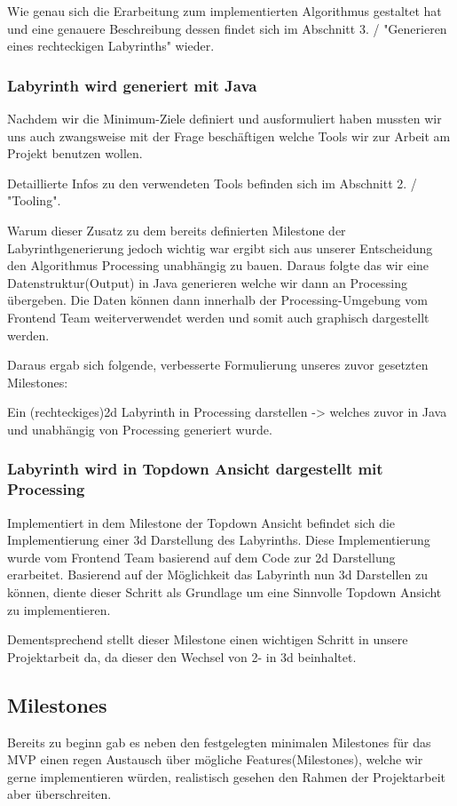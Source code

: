	Wie genau sich die Erarbeitung zum implementierten Algorithmus gestaltet hat und eine genauere Beschreibung dessen findet sich im Abschnitt 3. / "Generieren eines rechteckigen Labyrinths" wieder.

    \subsubsection*{Labyrinth wird generiert mit Java}
		Nachdem wir die Minimum-Ziele definiert und ausformuliert haben mussten wir uns auch zwangsweise mit der Frage beschäftigen welche Tools wir zur Arbeit am Projekt benutzen wollen.
		
		Detaillierte Infos zu den verwendeten Tools befinden sich im Abschnitt 2. / "Tooling".
		
		Warum dieser Zusatz zu dem bereits definierten Milestone der Labyrinthgenerierung jedoch wichtig war ergibt sich aus unserer Entscheidung den Algorithmus Processing unabhängig zu bauen. Daraus folgte das wir eine Datenstruktur(Output) in Java generieren welche wir dann an Processing übergeben. Die Daten können dann innerhalb der Processing-Umgebung vom Frontend Team weiterverwendet werden und somit auch graphisch dargestellt werden.
		  
		Daraus ergab sich folgende, verbesserte Formulierung unseres zuvor gesetzten Milestones:    
		
		Ein (rechteckiges)2d Labyrinth in Processing darstellen -> welches zuvor in Java und unabhängig von Processing generiert wurde.
		
    \subsubsection*{Labyrinth wird in Topdown Ansicht dargestellt mit Processing}
    	Implementiert in dem Milestone der Topdown Ansicht befindet sich die Implementierung einer 3d Darstellung des Labyrinths. Diese Implementierung wurde vom Frontend Team basierend auf dem Code zur 2d Darstellung erarbeitet. Basierend auf der Möglichkeit das Labyrinth nun 3d Darstellen zu können, diente dieser Schritt als Grundlage um eine Sinnvolle Topdown Ansicht zu implementieren.
    	
    	Dementsprechend stellt dieser Milestone einen wichtigen Schritt in unsere Projektarbeit da, da dieser den Wechsel von 2- in 3d beinhaltet.


\subsection{Milestones}\label{subsec:milestones}
    Bereits zu beginn gab es neben den festgelegten minimalen Milestones für das MVP einen regen Austausch über mögliche Features(Milestones), welche wir gerne implementieren würden, realistisch gesehen den Rahmen der Projektarbeit aber überschreiten.
    
